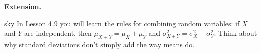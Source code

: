 \documentclass[10pt]{article}
\begin{document}
\vspace{0.1in}

\begin{extensionbox}
\small
\textbf{Extension.}
\end{extensionbox}

\vspace{0.1in}

\begin{blurbbox}{sky}
\small
In Lesson 4.9 you will learn the rules for combining random variables: if $X$ and $Y$ are
independent, then $\mu_{X+Y} = \mu_X + \mu_Y$ and $\sigma^2_{X+Y} = \sigma^2_X + \sigma^2_Y$.
Think about why standard deviations don't simply add the way means do.
\end{blurbbox}
\end{document}

